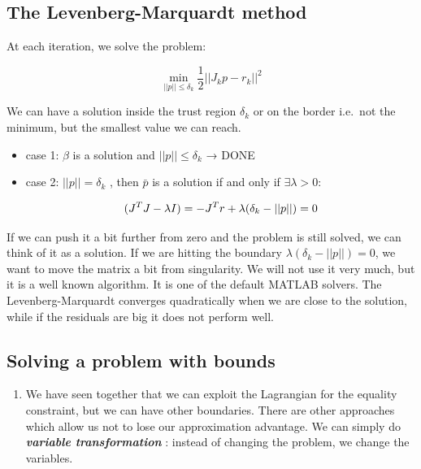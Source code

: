 \hypertarget{the-levenberg-marquardt-method}{%
\subsection{The Levenberg-Marquardt
method}\label{the-levenberg-marquardt-method}}

At each iteration, we solve the problem:

$$
\min_{||p||\leq\delta_k} \frac{1}{2} ||J_kp-r_k||^2
$$

We can have a solution inside the trust region $\delta_k$ or on the
border i.e.~not the minimum, but the smallest value we can reach.

\begin{itemize}
\item
  case 1: $\beta$ is a solution and $||p||\leq\delta_k$ → DONE
\item
  case 2: $||p||=\delta_k$ , then $\bar{p}$ is a solution if and only if
  $\exists \lambda > 0$:

  $$
    (J^TJ-\lambda I)=-J^Tr \\ + \lambda(\delta_k-||p||)=0
    $$
\end{itemize}

If we can push it a bit further from zero and the problem is still
solved, we can think of it as a solution. If we are hitting the boundary
$\lambda(\delta_k-||p||)=0$, we want to move the matrix a bit from
singularity. We will not use it very much, but it is a well known
algorithm. It is one of the default MATLAB solvers. The
Levenberg-Marquardt converges quadratically when we are close to the
solution, while if the residuals are big it does not perform well.

\hypertarget{solving-a-problem-with-bounds}{%
\subsection{Solving a problem with
bounds}\label{solving-a-problem-with-bounds}}

\begin{enumerate}
\def\labelenumi{\arabic{enumi}.}
\tightlist
\item
  We have seen together that we can exploit the Lagrangian for the
  equality constraint, but we can have other boundaries. There are other
  approaches which allow us not to lose our approximation advantage. We
  can simply do \textbf{\emph{variable transformation}} : instead of
  changing the problem, we change the variables.
\end{enumerate}

